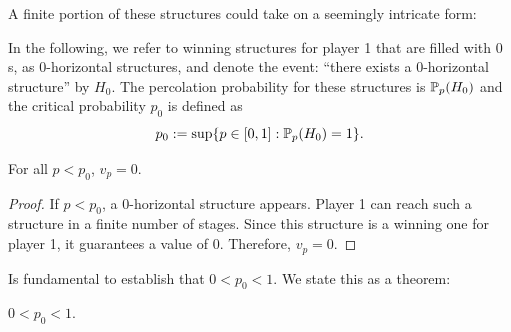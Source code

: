        A finite portion of these structures could take on a seemingly intricate form:

       

       In the following, we refer to winning structures for player 1 that are filled with $0$s, as $0$-horizontal structures, and denote the event: ``there exists a $0$-horizontal structure'' by $H_0$. The percolation probability for these structures is $\mathbb{P}_p(H_0)$ and the critical probability $p_0$ is defined as
        \[
            p_0 := \sup\{ p \in [0, 1] : \mathbb{P}_p(H_0) = 1\}.
        \]     

        \begin{theorem}\label{conjecture-v0-p0}
            For all $p < p_0$, $v_p = 0$.
        \end{theorem}
        
        \begin{proof}
            If $p < p_0$, a $0$-horizontal structure appears. Player 1 can reach such a structure in a finite number of stages. Since this structure is a winning one for player 1, it guarantees a value of $0$. Therefore, $v_p =  0$.

        \end{proof}

        Is fundamental to establish that $0 < p_0 < 1$. We state this as a theorem:

        \begin{theorem}\label{theorem-p_0}
            $0 < p_0 < 1$.
        \end{theorem}


